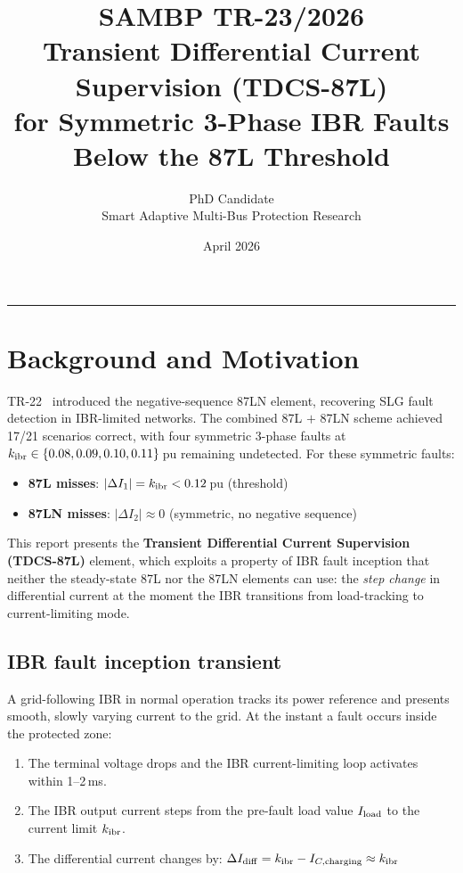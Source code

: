 \documentclass[11pt, a4paper]{article}
\title{\textbf{SAMBP TR-23/2026}\\[4pt]
       \large Transient Differential Current Supervision (TDCS-87L)\\
       for Symmetric 3-Phase IBR Faults Below the 87L Threshold}
\author{PhD Candidate\\[2pt]
        \small Smart Adaptive Multi-Bus Protection Research}
\date{April 2026}
\begin{document}
\maketitle
\tableofcontents
\vspace{6pt}\hrule\vspace{10pt}

\section{Background and Motivation}
\label{sec:background}

TR-22~\cite{SAMBP_TR22} introduced the negative-sequence 87LN element,
recovering SLG fault detection in IBR-limited networks.  The combined
87L $+$ 87LN scheme achieved 17/21 scenarios correct, with four symmetric
3-phase faults at $k_{\rm ibr} \in \{0.08, 0.09, 0.10, 0.11\}$\,pu remaining
undetected.  For these symmetric faults:
\begin{itemize}
  \item \textbf{87L misses}: $|\Delta I_1| = k_{\rm ibr} < 0.12$\,pu (threshold)
  \item \textbf{87LN misses}: $|\Delta I_2| \approx 0$ (symmetric, no
        negative sequence)
\end{itemize}

This report presents the \textbf{Transient Differential Current Supervision
(TDCS-87L)} element, which exploits a property of IBR fault inception that
neither the steady-state 87L nor the 87LN elements can use: the
\emph{step change} in differential current at the moment the IBR transitions
from load-tracking to current-limiting mode.

\subsection{IBR fault inception transient}

A grid-following IBR in normal operation tracks its power reference and
presents smooth, slowly varying current to the grid.  At the instant a
fault occurs inside the protected zone:
\begin{enumerate}
  \item The terminal voltage drops and the IBR current-limiting loop
        activates within 1--2\,ms.
  \item The IBR output current steps from the pre-fault load value
        $I_{\rm load}$ to the current limit $k_{\rm ibr}$.
  \item The differential current changes by:
        $\Delta I_{\rm diff} = k_{\rm ibr} - I_{C,\rm charging}
                              \approx k_{\rm ibr}$
\end{enumerate}
\end{document}
